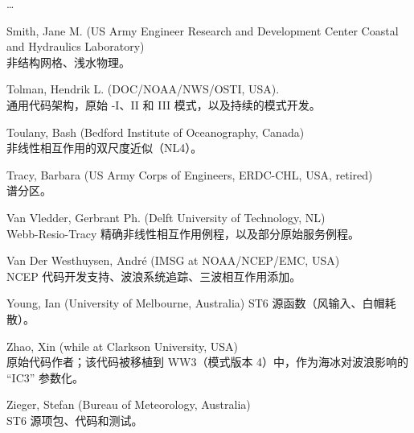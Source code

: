 \begin{list}{\ldots}{ }
\item [Smith, Jane M.] (US Army Engineer Research and Development Center Coastal and Hydraulics Laboratory) \\
  非结构网格、浅水物理。

\item [Tolman, Hendrik L.] (DOC/NOAA/NWS/OSTI, USA). \\
  通用代码架构，原始 \wt-I、II 和 III 模式，以及持续的模式开发。

\item [Toulany, Bash] (Bedford Institute of Oceanography, Canada)\\
  非线性相互作用的双尺度近似（NL4）。

\item [Tracy, Barbara] (US Army Corps of Engineers, ERDC-CHL, USA, retired) \\
  谱分区。

\item [Van Vledder, Gerbrant Ph.] (Delft University of Technology, NL) \\
  Webb-Resio-Tracy 精确非线性相互作用例程，以及部分原始服务例程。

\item [Van Der Westhuysen, Andr\'e](IMSG at NOAA/NCEP/EMC, USA) \\
  NCEP 代码开发支持、波浪系统追踪、三波相互作用添加。

\item [Young, Ian] (University of Melbourne, Australia)
  ST6 源函数（风输入、白帽耗散）。

\item [Zhao, Xin] (while at Clarkson University, USA) \\
  原始代码作者；该代码被移植到 WW3（模式版本 4）中，作为海冰对波浪影响的
  ``IC3'' 参数化。

\item [Zieger, Stefan] (Bureau of Meteorology, Australia) \\
  ST6 源项包、代码和测试。
\end{list}

